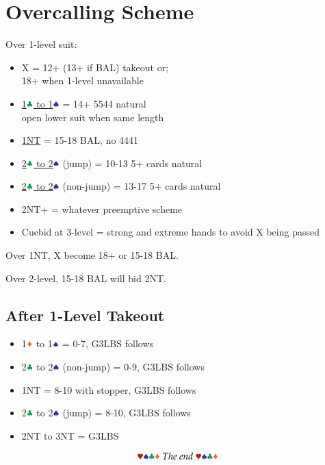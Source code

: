 \documentclass{article}
\begin{document}
\begin{multicols}{2}
\begin{CJK*}{UTF8}{gt}
\begin{itemize}
\end{itemize}

\section{Overcalling Scheme}
Over 1-level suit:
\begin{itemize}
    \item X = 12+ (13+ if BAL) takeout or; \\
        18+ when 1-level unavailable
    \item \hyperref[sec:strong-1]{1$\ccc$ to 1$\sss$} = 14+ 5544 natural \\
        open lower suit when same length
    \item \hyperref[sec:1n]{1NT} = 15-18 BAL, no 4441
    \item \hyperref[sec:intermediate-2]{2$\ccc$ to 2$\sss$} (jump) = 10-13 5+ cards natural
    \item \hyperref[sec:intermediate-2]{2$\ccc$ to 2$\sss$} (non-jump) = 13-17 5+ cards natural
    \item 2NT+ = whatever preemptive scheme
    \item Cuebid at 3-level = strong and extreme hands to avoid X being passed
\end{itemize}
\vspace{1em}

\noindent Over 1NT, X become 18+ or 15-18 BAL.

\noindent Over 2-level, 15-18 BAL will bid 2NT.

\subsection{After 1-Level Takeout}
\begin{itemize}
    \item 1$\ddd$ to 1$\sss$ = 0-7, G3LBS follows
    \item 2$\ccc$ to 2$\sss$ (non-jump) = 0-9, G3LBS follows
    \item 1NT = 8-10 with stopper, G3LBS follows
    \item 2$\ccc$ to 2$\sss$ (jump) = 8-10, G3LBS follows
    \item 2NT to 3NT = G3LBS
\end{itemize}

\columnbreak
$$\hhh\sss\ccc\ddd~The~end~\hhh\sss\ccc\ddd$$

\end{CJK*}
\end{multicols}
\end{document}
